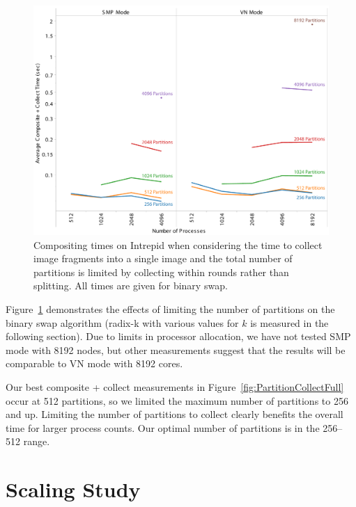\documentclass{acm_proc_article-sp}
\begin{document}
\begin{figure}[htbp]
  \centering
  \includegraphics[width=\linewidth]{images/PartitionCollectIntrepidReduced}
  \caption{Compositing times on Intrepid when considering the time to
    collect image fragments into a single image and the total number of
    partitions is limited by collecting within rounds rather than
    splitting.  All times are given for binary swap.}
  \label{fig:PartitionCollectReduced}
\end{figure}

Figure~\ref{fig:PartitionCollectReduced} demonstrates the effects of
limiting the number of partitions on the binary swap algorithm (radix-k
with various values for $k$ is measured in the following section).  Due to
limits in processor allocation, we have not tested SMP mode with 8192
nodes, but other measurements suggest that the results will be comparable
to VN mode with 8192 cores.

Our best composite + collect measurements in
Figure~\ref{fig:PartitionCollectFull} occur at 512 partitions, so we
limited the maximum number of partitions to 256 and up.  Limiting the
number of partitions to collect clearly benefits the overall time for
larger process counts.  Our optimal number of partitions is in the 256--512
range.

\section{Scaling Study}
\label{sec:Scaling}
\end{document}
